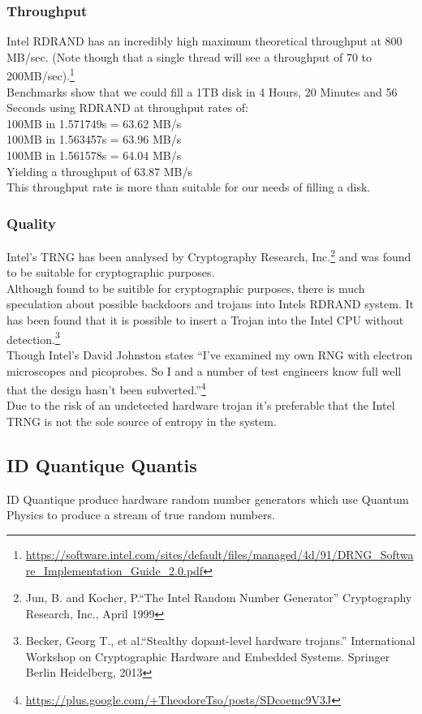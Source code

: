 \documentclass{paper}
\begin{document}
			\subsubsection{Throughput}
				Intel RDRAND has an incredibly high maximum theoretical throughput at 800 MB/sec. (Note though that a single thread will see a throughput of 70 to 200MB/sec).\footnote{\url{https://software.intel.com/sites/default/files/managed/4d/91/DRNG_Software_Implementation_Guide_2.0.pdf}} \\
				Benchmarks show that we could fill a 1TB disk in 4 Hours, 20 Minutes and 56 Seconds using RDRAND at throughput rates of:\\
				100MB in 1.571749s = 63.62 MB/s\\
				100MB in 1.563457s = 63.96 MB/s\\
				100MB in 1.561578s = 64.04 MB/s\\
				Yielding a  throughput of 63.87 MB/s\\
				This throughput rate is more than suitable for our needs of filling a disk.
			\subsubsection{Quality}
				Intel's TRNG has been analysed by Cryptography Research, Inc.\footnote{Jun, B. and Kocher, P.``The Intel Random Number Generator'' Cryptography Research, Inc., April 1999} and was found to be suitable for cryptographic purposes.\\
				Although found to be suitible for cryptographic purposes, there is much speculation about possible backdoors and trojans into Intels RDRAND system. It has been found that it is possible to insert a Trojan into the Intel CPU without detection.\footnote{Becker, Georg T., et al.``Stealthy dopant-level hardware trojans.'' International Workshop on Cryptographic Hardware and Embedded Systems. Springer Berlin Heidelberg, 2013}\\
				Though Intel's David Johnston states ``I’ve examined my own RNG with electron microscopes and picoprobes. So I and a number of test engineers know full well that the design hasn’t been subverted.''\footnote{\url{https://plus.google.com/+TheodoreTso/posts/SDcoemc9V3J}}\\
				Due to the risk of an undetected hardware trojan it's preferable that the Intel TRNG is not the sole source of entropy in the system.
				
		\subsection{ID Quantique Quantis}
		ID Quantique produce hardware random number generators which use Quantum Physics to produce a stream of true random numbers.
\end{document}
